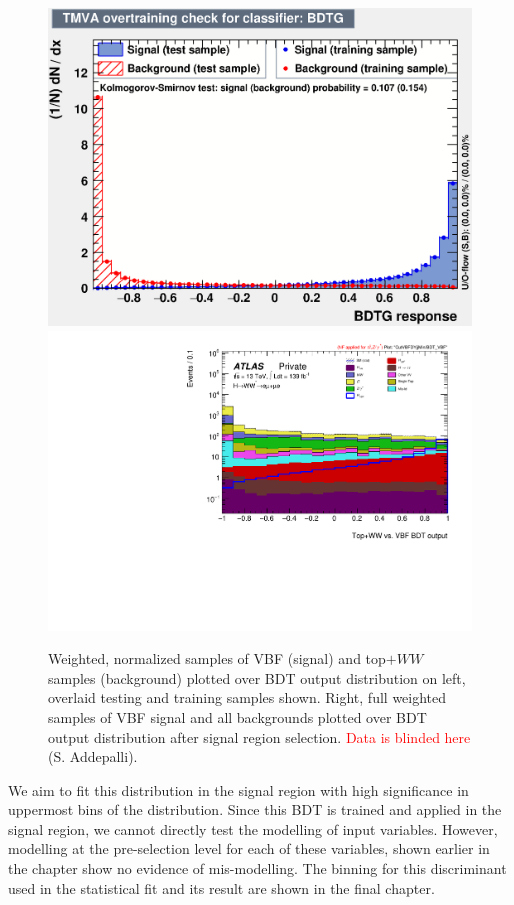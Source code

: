 \begin{figure}[!htbp]
\centering
  \includegraphics[width=.45\linewidth]{Pictures/VBFvsWW+Top/overtrain_BDTG.eps}
  \includegraphics[width=.35\linewidth]{Pictures/run2-emme-CutVBFDYjjMin-BDT_VBF-log.pdf}
\caption{Weighted, normalized samples of VBF (signal) and top$+WW$ samples (background) plotted over BDT output distribution on left, overlaid testing and training samples shown. Right, full weighted samples of VBF signal and all backgrounds plotted over BDT output distribution after signal region selection. \textcolor{red}{Data is blinded here} (S. Addepalli).}
\label{fig:SRBDTresult}
\end{figure}

We aim to fit this distribution in the signal region with high significance in uppermost bins of the distribution. Since this BDT is trained and applied in the signal region, we cannot directly test the modelling of input variables. However, modelling at the pre-selection level for each of these variables, shown earlier in the chapter show no evidence of mis-modelling. The binning for this discriminant used in the statistical fit and its result are shown in the final chapter. 
